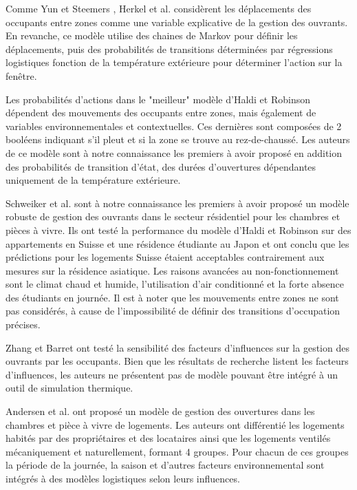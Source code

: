 Comme Yun et Steemers \cite{Yun-08}, Herkel et al. \cite{Herkel-08} considèrent les déplacements des occupants entre zones comme une variable explicative de la gestion des ouvrants. En revanche, ce modèle utilise des chaines de Markov pour définir les déplacements, puis des probabilités de transitions déterminées par régressions logistiques fonction de la température extérieure pour déterminer l'action sur la fenêtre.

Les probabilités d'actions dans le "meilleur" modèle d'Haldi et Robinson \cite{Haldi-09} dépendent des mouvements des occupants entre zones, mais également de variables environnementales et contextuelles. Ces dernières sont composées de 2 booléens indiquant s'il pleut et si la zone se trouve au rez-de-chaussé. Les auteurs de ce modèle sont à notre connaissance les premiers à avoir proposé en addition des probabilités de transition d'état, des durées d'ouvertures dépendantes uniquement de la température extérieure.

Schweiker et al. \cite{Schweiker-12} sont à notre connaissance les premiers à avoir proposé un modèle robuste de gestion des ouvrants dans le secteur résidentiel pour les chambres et pièces à vivre. Ils ont testé la performance du modèle d'Haldi et Robinson \cite{Haldi-09} sur des appartements en Suisse et une résidence étudiante au Japon et ont conclu que les prédictions pour les logements Suisse étaient acceptables contrairement aux mesures sur la résidence asiatique. Les raisons avancées au non-fonctionnement sont le climat chaud et humide, l'utilisation d'air conditionné et la forte absence des étudiants en journée. Il est à noter que les mouvements entre zones ne sont pas considérés, à cause de l'impossibilité de définir des transitions d'occupation précises.

Zhang et Barret \cite{Zhang-12} ont testé la sensibilité des facteurs d'influences sur la gestion des ouvrants par les occupants. Bien que les résultats de recherche listent les facteurs d'influences, les auteurs ne présentent pas de modèle pouvant être intégré à un outil de simulation thermique.

Andersen et al. \cite{Andersen-13} ont proposé un modèle de gestion des ouvertures dans les chambres et pièce à vivre de logements. Les auteurs ont différentié les logements habités par des propriétaires et des locataires ainsi que les logements ventilés mécaniquement et naturellement, formant 4 groupes. Pour chacun de ces groupes la période de la journée, la saison et d'autres facteurs environnemental sont intégrés à des modèles logistiques selon leurs influences. 

